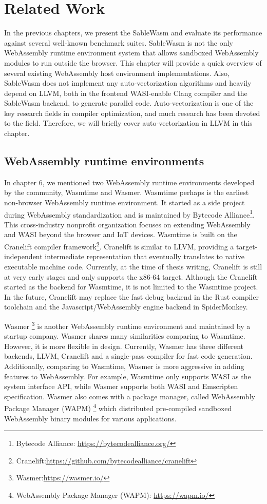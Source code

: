\chapter{Related Work}

In the previous chapters, we present the SableWasm and evaluate its performance against several well-known benchmark suites. SableWasm is not the only WebAssembly runtime environment system that allows sandboxed WebAssembly modules to run outside the browser. This chapter will provide a quick overview of several existing WebAssembly host environment implementations. Also, SableWasm does not implement any auto-vectorization algorithms and heavily depend on LLVM, both in the frontend WASI-enable Clang compiler and the SableWasm backend, to generate parallel code. Auto-vectorization is one of the key research fields in compiler optimization, and much research has been devoted to the field. Therefore, we will briefly cover auto-vectorization in LLVM in this chapter.

\section*{WebAssembly runtime environments}

In chapter 6, we mentioned two WebAssembly runtime environments developed by the community, Wasmtime and Wasmer. Wasmtime perhaps is the earliest non-browser WebAssembly runtime environment. It started as a side project during WebAssembly standardization and is maintained by Bytecode Alliance\footnote{Bytecode Alliance: \url{https://bytecodealliance.org/}}. This cross-industry nonprofit organization focuses on extending WebAssembly and WASI beyond the browser and IoT devices. Wasmtime is built on the Cranelift compiler framework\footnote{Cranelift:\url{https://github.com/bytecodealliance/cranelift}}. Cranelift is similar to LLVM, providing a target-independent intermediate representation that eventually translates to native executable machine code. Currently, at the time of thesis writing, Cranelift is still at very early stages and only supports the x86-64 target. Although the Cranelift started as the backend for Wasmtime, it is not limited to the Wasmtime project. In the future, Cranelift may replace the fast debug backend in the Rust compiler toolchain and the Javascript/WebAssembly engine backend in SpiderMonkey.

Wasmer \footnote{Wasmer:\url{https://wasmer.io/}} is another WebAssembly runtime environment and maintained by a startup company. Wasmer shares many similarities comparing to Wasmtime. However, it is more flexible in design. Currently, Wasmer has three different backends, LLVM, Cranelift and a single-pass compiler for fast code generation. Additionally, comparing to Wasmtime, Wasmer is more aggressive in adding features to WebAssembly. For example, Wasmtime only supports WASI as the system interface API, while Wasmer supports both WASI and Emscripten specification. Wasmer also comes with a package manager, called WebAssembly Package Manager (WAPM) \footnote{WebAssembly Package Manager (WAPM): \url{https://wapm.io/}} which distributed pre-compiled sandboxed WebAssembly binary modules for various applications.

